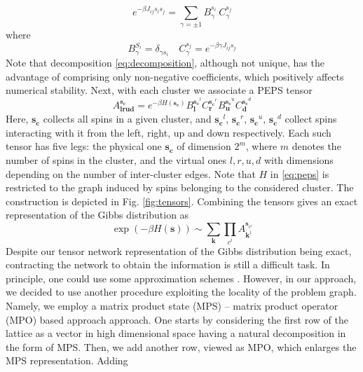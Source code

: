 \begin{equation}
  e^{-\beta J_{ij}s_i s_j} = \sum_{\gamma = \pm 1} B^{s_{i\phantom{j}}}_\gamma C^{s_j}_\gamma
\end{equation}
where
\begin{equation}
  \label{eq:decomposition}
  B^{S_i}_\gamma = \delta_{\gamma s_i} \quad C^{s_j}_\gamma = e^{-\beta \gamma J_{ij} s_j}
\end{equation}
Note that decomposition \eqref{eq:decomposition}, although not unique, has the
advantage of comprising only non-negative coefficients, which positively
affects numerical stability. Next, with each cluster we associate a PEPS tensor
\begin{equation}
  \label{eq:peps}
  A^{\mathbf{s_c}}_{\mathbf{lrud}} = e^{-\beta H(\mathbf{s_c})} B^{\mathbf{s_c}^l}_\mathbf{l}C^{\mathbf{s_c}^r}_\mathbf{r}B^{\mathbf{s_c}^u}_\mathbf{u}C^{\mathbf{s_c}^d}_\mathbf{d}
\end{equation}
Here, $\mathbf{s_c}$ collects all spins in a given cluster, and
  $\mathbf{s_c}^l$, $\mathbf{s_c}^r$, $\mathbf{s_c}^u$, $\mathbf{s_c}^d$ collect
    spins interacting with it from the left, right, up and down respectively. Each
    such tensor has five legs: the physical one $\mathbf{s_c}$ of dimension $2^m$,
    where $m$ denotes the number of spins in the cluster, and the virtual ones $l,
  r, u, d$ with dimensions depending on the number of inter-cluster edges. Note
    that $H$ in \eqref{eq:peps} is restricted to the graph induced by spins
belonging to the considered cluster. The construction is depicted in Fig.
\ref{fig:tensors}. Combining the tensors gives an exact representation of the
Gibbs distribution as
\begin{equation}
  \exp(-\beta H(\mathbf{s})) \sim \sum_{\mathbf{k}}\prod_{c^{i}}A_{\mathbf{k}^{i}}^{\mathbf{s}_{c^{i}}}
\end{equation}
Despite our tensor network representation of the Gibbs distribution being
exact, contracting the network to obtain the information is still a difficult
task. In principle, one could use some approximation schemes \cite{lewenstein}.
However, in our approach, we decided to use another procedure exploiting the
locality of the problem graph. Namely, we employ a matrix product state (MPS)
-- matrix product operator (MPO) based approach \cite{murg} approach. One
starts by considering the first row of the lattice as a vector in high
dimensional space having a natural decomposition in the form of MPS. Then, we
add another row, viewed as MPO, which enlarges the MPS representation. Adding
